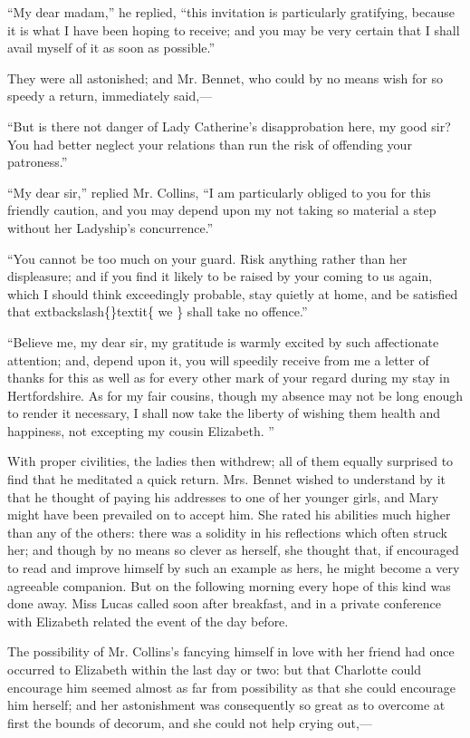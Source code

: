 \documentclass[10pt]{book}
\begin{document}
   “My dear madam,” he replied, “this invitation is particularly
gratifying, because it is what I have been hoping to receive; and you
may be very certain that I shall avail myself of it as soon as
possible.”
  

   They were all astonished; and Mr. Bennet, who could by no means wish for
so speedy a return, immediately said,—
  

   “But is there not danger of Lady Catherine’s disapprobation here, my
good sir? You had better neglect your relations than run the risk of
offending your patroness.”
  

   “My dear sir,” replied Mr. Collins, “I am particularly obliged to you
for this friendly caution, and you may depend upon my not taking so
material a step without her Ladyship’s concurrence.”
  

   “You cannot be too much on your guard. Risk anything rather than her
displeasure; and if you find it likely to be raised by your coming to us
again, which I should think exceedingly probable, stay quietly at home,
and be satisfied that
   	extbackslash\{\}textit\{
    we
   \}
   shall take no offence.”
  

   “Believe me, my dear sir, my gratitude is warmly excited by such
affectionate attention; and, depend upon it, you will speedily receive
from me a letter of thanks for this as well as for every other mark of
your regard during my stay in Hertfordshire. As for my fair cousins,
though my absence may not be long enough to render it necessary, I shall
now take the liberty of wishing them health and happiness, not excepting
my cousin Elizabeth.
   ”
  

   With proper civilities, the ladies then withdrew; all of them equally
surprised to find that he meditated a quick return. Mrs. Bennet wished
to understand by it that he thought of paying his addresses to one of
her younger girls, and Mary might have been prevailed on to accept him.
She rated his abilities much higher than any of the others: there was a
solidity in his reflections which often struck her; and though by no
means so clever as herself, she thought that, if encouraged to read and
improve himself by such an example as hers, he might become a very
agreeable companion. But on the following morning every hope of this
kind was done away. Miss Lucas called soon after breakfast, and in a
private conference with Elizabeth related the event of the day before.
  

   The possibility of Mr. Collins’s fancying himself in love with her
friend had once occurred to Elizabeth within the last day or two: but
that Charlotte could encourage him seemed almost as far from possibility
as that she could encourage him herself; and her astonishment was
consequently so great as to overcome at first the bounds of decorum, and
she could not help crying out,—
  
\end{document}
